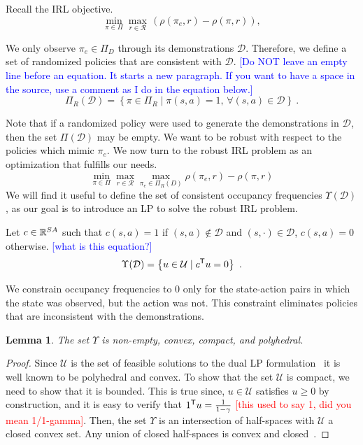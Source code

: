 \documentclass[11pt]{uai2023}
\newtheorem{lemma}{Lemma}
\newcommand{\mm}[1]{\textcolor{blue}{[#1]}}
\newcommand{\gersi}[1]{\textcolor{red}{[#1]}}
\begin{document}
Recall the IRL objective.
\begin{equation}
	\min_{\pi \in \Pi} \max_{r \in \mathcal{R}}  \, (\rho(\pi_e, r) - \rho(\pi, r)),
\end{equation}

We only observe $\pi_e \in \Pi_D$ through its demonstrations $\mathcal{D}$. Therefore, we define a set of randomized policies that are consistent with $\mathcal{D}$.
\mm{Do NOT leave an empty line before an equation. It starts a new paragraph. If you want to have a space in the source, use a comment as I do in the equation below.}
\begin{equation} \label{eq:consistent-policies}
	\Pi_R(\mathcal{D}) = \left\{ \pi \in \Pi_R \mid \pi(s,a) = 1, \, \forall (s,a) \in \mathcal{D} \right\}~.
\end{equation}

Note that if a randomized policy were used to generate the demonstrations in
$\mathcal{D}$, then the set $\Pi(\mathcal{D})$ may be empty. We want to be robust with respect to the policies which mimic $\pi_e$.
We now turn to the robust IRL problem as an optimization that fulfills our needs.
%
\begin{equation}
	\label{eq:robust_IRL_formulation}
	\min_{\pi \in \Pi} \max_{r \in \mathcal{R}} \max_{\pi_e \in \Pi_{R}(D)} \rho(\pi_e, r) - \rho(\pi, r)
\end{equation}
%
We will find it useful to define the set of consistent occupancy frequencies $\Upsilon(\mathcal{D})$, as our goal is to introduce an LP to solve
the robust IRL problem.

Let $c \in \mathbb{R}^{SA}$ such that $c(s,a) = 1$ if $(s,a) \notin \mathcal{D}$ and $(s, \cdot) \in \mathcal{D}$, $c(s,a)  = 0$ otherwise. \mm{what is this equation?}
%
\begin{equation}\label{eq:consistent-occupancies}
	\Upsilon(\mathcal{D}) = \left\{ u \in \mathcal{U} \mid c^{\mathsf{T}} u = 0  \right\}~.
\end{equation}


We constrain occupancy frequencies to 0 only for the state-action pairs in which the state was observed, but the action was not. This constraint eliminates policies that are inconsistent with the demonstrations.
%
\begin{lemma}\label{prop:convexity_of_Upsilon}
The set $\Upsilon$ is non-empty, convex, compact, and polyhedral.
\end{lemma}
\begin{proof}
Since $\mathcal{U}$ is the set of feasible solutions to the dual LP formulation~\cite[Eq.~(6.9.2)]{Puterman1994} it is well known to be polyhedral and convex. To show that the set $\mathcal{U}$ is compact, we need to show that it is bounded. This is true since, $u \in \mathcal{U}$ satisfies $u \ge 0$ by construction, and it is easy to verify that $1^{\mathsf{T}} u = \frac{1}{1-\gamma}$ \gersi{this used to say 1, did you mean 1/1-gamma}. Then, the set $\Upsilon$ is an intersection of half-spaces with $\mathcal{U}$ a closed convex set. Any union of closed half-spaces is convex and closed~\cite[eq.~(2.2.1)]{boyd_convex_optimization}.
\end{proof}
\end{document}
